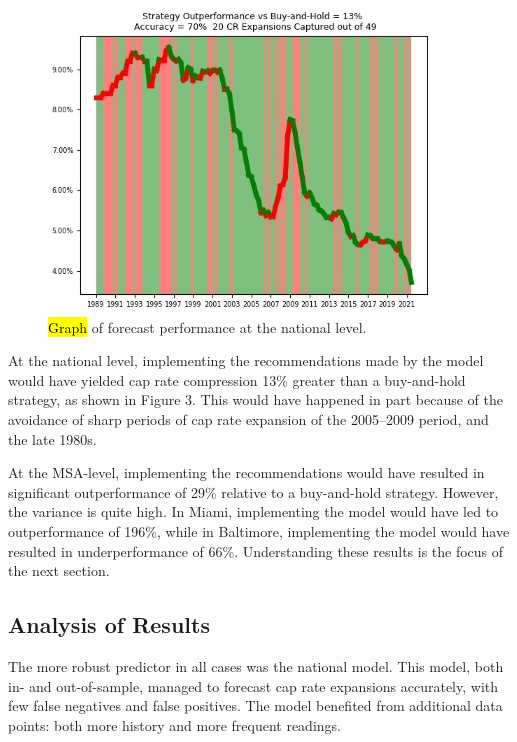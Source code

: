 \documentclass[jrfm,article,accept,oneauthor,pdftex]{Definitions/mdpi}
\begin{document}
\begin{figure}[H]
\includegraphics[scale=.9]{Definitions/national_performance.jpg}
\caption{\hl{Graph} 
 of forecast performance at the national level.\label{fig1}}
\end{figure}   %

At the national level, implementing the recommendations made by the model would have yielded cap rate compression 13\% greater than a buy-and-hold strategy, as shown in Figure 3. This would have happened in part because of the avoidance of sharp periods of cap rate expansion of the 2005--2009 period, and the late 1980s.

At the MSA-level, implementing the recommendations would have resulted in significant outperformance of 29\% relative to a buy-and-hold strategy. However, the variance is quite high. In Miami, implementing the model would have led to outperformance of 196\%, while in Baltimore, implementing the model would have resulted in underperformance of 66\%. Understanding these results is the  focus of the next section.



\subsection*{Analysis of Results}

The more robust predictor in all cases was the national model. This model, both in- and out-of-sample, managed to forecast cap rate expansions accurately, with few false negatives and false positives. The model benefited from additional data points: both more history and more frequent readings. 
\end{document}
